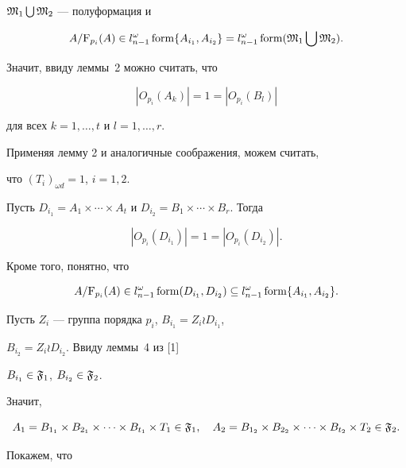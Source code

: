 \begin{pf}
$\frak{M}_1\bigcup\frak{M}_2$ --- полуформация и


$$


A/{\mathrm F}_{p_i}(A)\in l^{\omega}_{n-1}\form \{A_{i_1},A_{i_2}\}=


l_{n-1}^{\omega}\form (\frak{M}_1\bigcup\frak{M}_2).


$$


Значит, ввиду леммы~2 можно считать, что


$$


|O_{p_i}(A_k)|=1=|O_{p_i}(B_l)|


$$


для всех $k=1,\dotsc,t$ и $l=1,\dotsc,r$.





Применяя лемму 2 и аналогичные соображения, можем считать,


что $(T_i)_{\omega d}=1$, $i=1,2$.





Пусть $D_{i_1}=A_1\times\dotsb \times A_t$ и $D_{i_2}=B_1\times\dotsb


\times B_r$. Тогда


$$


|O_{p_i}(D_{i_1})|=1=|O_{p_i}(D_{i_2})|.


$$


Кроме того, понятно, что


$$


A/{\mathrm F}_{p_i}(A)\in l^{\omega}_{n-1}\form (D_{i_1},D_{i_2})


\subseteq l_{n-1}^{\omega}\form \{A_{i_1},A_{i_2}\}.


$$





Пусть $Z_i$ --- группа порядка $p_i$, $B_{i_1}=Z_i\wr D_{i_1}$,


$B_{i_2}=Z_i\wr D_{i_2}$. Ввиду леммы~4 из [1]


$B_{i_1}\in\frak{F}_1$, $B_{i_2}\in\frak{F}_2$.


Значит,


$$


A_1=B_{1_1}\times B_{2_1}\times\dotsb\times


B_{t_1}\times T_1\in\frak{F}_1, \quad A_2=B_{1_2}\times B_{2_2}


\times\dotsb\times B_{t_2}\times T_2\in\frak{F}_2.


$$


Покажем, что



\end{pf}
